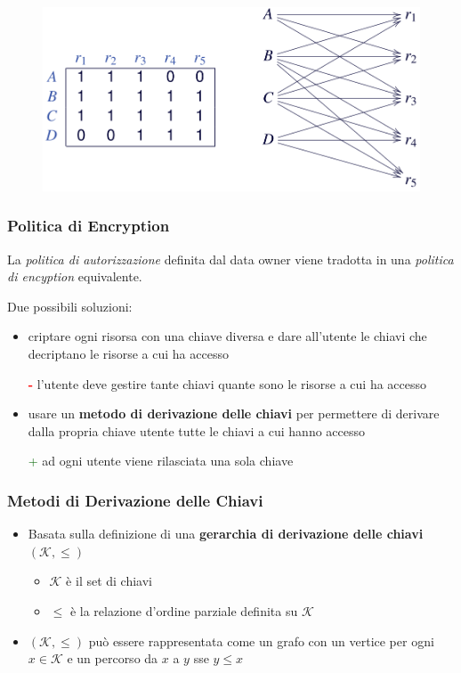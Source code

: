 \documentclass{report}
\begin{document}
\begin{figure}[ht]
    \centering
    \includegraphics[width=0.7\linewidth]{images/encryption/auth-policy.png}
\end{figure}

\subsubsection{Politica di Encryption}
La \textit{politica di autorizzazione} definita dal data owner viene tradotta
in una \textit{politica di encyption} equivalente.

\noindent Due possibili soluzioni:
\begin{itemize}
    \item criptare ogni risorsa con una chiave diversa e dare all'utente le chiavi 
    che decriptano le risorse a cui ha accesso 

    \textcolor{red}{\textbf{-}} l'utente deve gestire tante chiavi quante sono le risorse a cui ha accesso
    \item usare un \textbf{metodo di derivazione delle chiavi} per permettere di derivare dalla propria chiave utente 
    tutte le chiavi a cui hanno accesso 

    \textcolor{darkgreen}{+} ad ogni utente viene rilasciata una sola chiave
\end{itemize}

\subsubsection{Metodi di Derivazione delle Chiavi}
\begin{itemize}
    \item Basata sulla definizione di una \textbf{gerarchia di derivazione delle chiavi} $(\mathcal{K}, \leq)$
    \begin{itemize}
        \item $\mathcal{K}$ è il set di chiavi 
        \item $\leq$ è la relazione d'ordine parziale definita su $\mathcal{K}$
    \end{itemize}
    \item $(\mathcal{K}, \leq)$ può essere rappresentata come un grafo con un vertice per ogni $x \in \mathcal{K}$ e un percorso da $x$ a $y$ sse $y \leq x$
\end{itemize}
\end{document}
